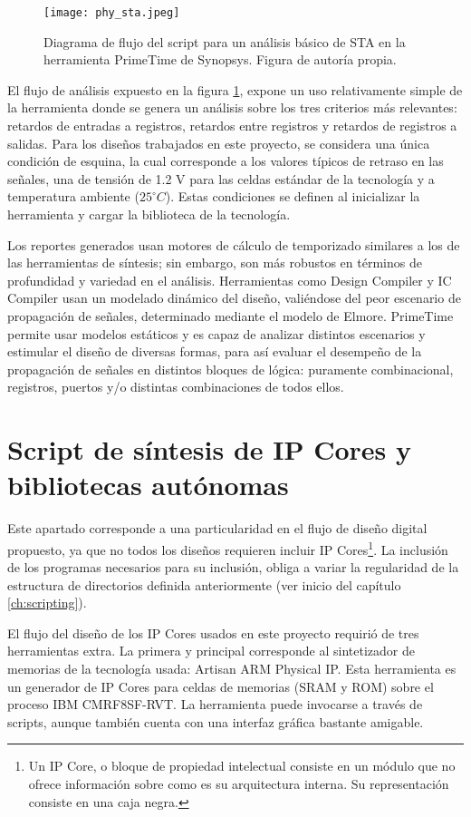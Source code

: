 \begin{figure}[ht]
\texttt{[image: phy\_sta.jpeg]}
\centering
\caption{Diagrama de flujo del script para un análisis básico de STA en la herramienta PrimeTime de Synopsys. Figura de autoría propia.}
\label{fig:stascript}
\end{figure}

El flujo de análisis expuesto en la figura \ref{fig:stascript}, expone un uso relativamente simple de la herramienta donde se genera un análisis sobre los tres criterios más relevantes: retardos de entradas a registros, retardos entre registros y retardos de registros a salidas. Para los diseños trabajados en este proyecto, se considera una única condición de esquina, la cual corresponde a los valores típicos de retraso en las señales, una de tensión de 1.2 V para las celdas estándar de la tecnología y a temperatura ambiente ($25^{\circ}C$). Estas condiciones se definen al inicializar la herramienta y cargar la biblioteca de la tecnología.

Los reportes generados usan motores de cálculo de temporizado similares a los de las herramientas de síntesis; sin embargo, son más robustos en términos de profundidad y variedad en el análisis. Herramientas como Design Compiler y IC Compiler usan un modelado dinámico del diseño, valiéndose del peor escenario de propagación de señales, determinado mediante el modelo de Elmore. PrimeTime permite usar modelos estáticos y es capaz de analizar distintos escenarios y estimular el diseño de diversas formas, para así evaluar el desempeño de la propagación de señales en distintos bloques de lógica: puramente combinacional, registros, puertos y/o distintas combinaciones de todos ellos.

\section{Script de síntesis de IP Cores y bibliotecas autónomas}
\label{sec:ip_syn}
Este apartado corresponde a una particularidad en el flujo de diseño digital propuesto, ya que no todos los diseños requieren incluir IP Cores\footnote{Un IP Core, o bloque de propiedad intelectual consiste en un módulo que no ofrece información sobre como es su arquitectura interna. Su representación consiste en una caja negra.}. La inclusión de los programas necesarios para su inclusión, obliga a variar la regularidad de la estructura de directorios definida anteriormente (ver inicio del capítulo \ref{ch:scripting}).

El flujo del diseño de los IP Cores usados en este proyecto requirió de tres herramientas extra. La primera y principal corresponde al sintetizador de memorias de la tecnología usada: Artisan ARM Physical IP. Esta herramienta es un generador de IP Cores para celdas de memorias (SRAM y ROM) sobre el proceso IBM CMRF8SF-RVT. La herramienta puede invocarse a través de scripts, aunque también cuenta con una interfaz gráfica bastante amigable.

